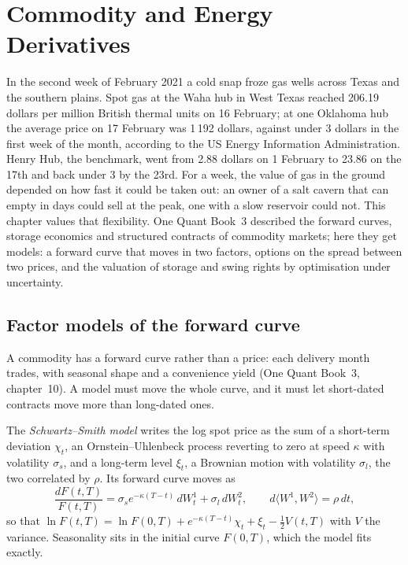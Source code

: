 \chapter{Commodity and Energy Derivatives}\label{ch:rc:commodity-and-energy-derivatives}

In the second week of February 2021 a cold snap froze gas wells across Texas and the
southern plains. Spot gas at the Waha hub in West Texas reached 206.19 dollars per
million British thermal units on 16 February; at one Oklahoma hub the average price on
17 February was 1\,192 dollars, against under 3 dollars in the first week of the month,
according to the US Energy Information Administration. Henry Hub, the benchmark, went
from 2.88 dollars on 1 February to 23.86 on the 17th and back under 3 by the 23rd. For a
week, the value of gas in the ground depended on how fast it could be taken out: an
owner of a salt cavern that can empty in days could sell at the peak, one with a slow
reservoir could not. This chapter values that flexibility. One Quant Book~3 described
the forward curves, storage economics and structured contracts of commodity markets;
here they get models: a forward curve that moves in two factors, options on the spread
between two prices, and the valuation of storage and swing rights by optimisation under
uncertainty.

\section{Factor models of the forward curve}

A commodity has a forward curve rather than a price: each delivery month trades, with
seasonal shape and a convenience yield (One Quant Book~3, chapter~10). A model must move
the whole curve, and it must let short-dated contracts move more than long-dated ones.

\begin{definition}\label{def:rc:commodity-and-energy-derivatives:ss}
The \emph{Schwartz--Smith model} writes the log spot price
as the sum of a short-term deviation $\chi_t$, an Ornstein--Uhlenbeck process reverting to
zero at speed $\kappa$ with volatility $\sigma_s$, and a long-term level $\xi_t$, a Brownian
motion with volatility $\sigma_l$, the two correlated by $\rho$. Its forward curve moves as
\[
\frac{dF(t,T)}{F(t,T)} = \sigma_se^{-\kappa(T-t)}\,dW^1_t+\sigma_l\,dW^2_t,\qquad d\langle W^1,W^2\rangle = \rho\,dt,
\]
so that $\ln F(t,T) = \ln F(0,T)+e^{-\kappa(T-t)}\chi_t+\xi_t-\tfrac12V(t,T)$ with $V$ the variance.
Seasonality sits in the initial curve $F(0,T)$, which the model fits exactly.
\end{definition}

